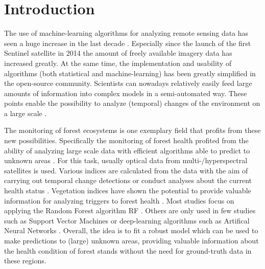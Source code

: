 \documentclass[review]{elsarticle}
\begin{document}
\section{Introduction}
\label{sec:intro}

The use of machine-learning algorithms for analyzing remote sensing data has seen a huge increase in the last decade \citep{lary2016}.
Especially since the launch of the first Sentinel satellite in 2014 the amount of freely available imagery data has increased greatly.
At the same time, the implementation and usability of algorithms (both statistical and machine-learning) has been greatly simplified in the open-source community.
Scientists can nowadays relatively easily feed large amounts of information into complex models in a semi-automated way.
These points enable the possibility to analyze (temporal) changes of the environment on a large scale \citep{ma2015}.

The monitoring of forest ecosystems is one exemplary field that profits from these new possibilities.
Specifically the monitoring of forest health profited from the ability of analyzing large scale data with efficient algorithms able to predict to unknown areas \citep{hawrylo2018, mascaro2014}.
For this task, usually optical data from multi-/hyperspectral satellites is used.
Various indices are calculated from the data with the aim of carrying out temporal change detections \citep{zhang2016} or conduct analyses about the current health status \citep{townsend2012}.
Vegetation indices have shown the potential to provide valuable information for analyzing triggers to forest health \citep{jiang2014, adamczyk2015}.
Most studies focus on applying the Random Forest algorithm \ac{RF} \citep{belgiu2016, lary2016, michez2016}.
Others are only used in few studies such as Support Vector Machines \citep{clark2018} or deep-learning algorithms such as Artifical Neural Networks \citep{ingram2005, rocha2018}.
Overall, the idea is to fit a robust model which can be used to make predictions to (large) unknown areas, providing valuable information about the health condition of forest stands without the need for ground-truth data in these regions.
\end{document}
